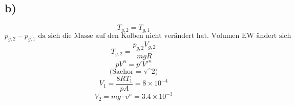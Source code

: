 

\subsection*{b)}
\[
T_{g,2} = T_{g,1}
\]
\[
p_{g,2} - p_{g,1} \text{ da sich die Masse auf den Kolben nicht verändert hat. Volumen EW ändert sich nicht. Gas komprimiert somit höherer Druck jedoch höhere Temperatur}
\]
\[
T_{g,2} = \frac{p_{g,2} V_{g,2}}{mg R}
\]
\[
pV^n = p'V'^n
\]
\[
\text{(Sachor = v^2)}
\]
\[
V_1 = \frac{8RT_1}{pA} = 8 \times 10^{-4}
\]
\[
V_2 = mg \cdot v^n = 3.4 \times 10^{-3}
\]